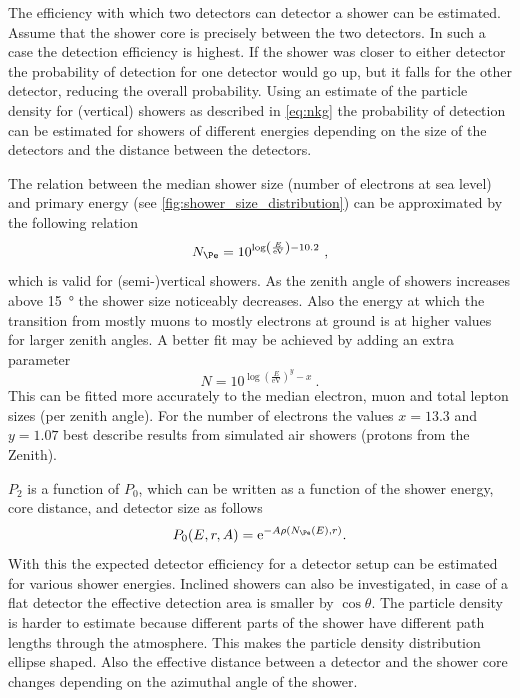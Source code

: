 The efficiency with which two detectors can detector a shower can be estimated. Assume that the shower core is precisely between the two detectors. In such a case the detection efficiency is highest. If the shower was closer to either detector the probability of detection for one detector would go up, but it falls for the other detector, reducing the overall probability. Using an estimate of the particle density for (vertical) showers as described in \cref{eq:nkg} the probability of detection can be estimated for showers of different energies depending on the size of the detectors and the distance between the detectors.

The relation between the median shower size (number of electrons at sea level) and primary energy (see \cref{fig:shower_size_distribution}) can be approximated by the following relation
%
\begin{equation}
    N_{\Pe} = 10^{\log\left(\frac{E}{\si{\eV}}\right) - 10.2} \ ,
\end{equation}
%
which is valid for (semi-)vertical showers. As the zenith angle of showers increases above \SI{15}{\degree} the shower size noticeably decreases. Also the energy at which the transition from mostly muons to mostly electrons at ground is at higher values for larger zenith angles. A better fit may be achieved by adding an extra parameter
%
\begin{equation}
    N = 10^{\log\left(\frac{E}{\si{\eV}}\right)^y - x} \ .
\end{equation}
%
This can be fitted more accurately to the median electron, muon and total lepton sizes (per zenith angle). For the number of electrons the values $x = 13.3$ and $y = 1.07$ best describe results from simulated air showers (protons from the Zenith).

$P_2$ is a function of $P_0$, which can be written as a function of the shower energy, core distance, and detector size as follows
%
\begin{equation}
    P_0(E, r, A) = \mathrm{e}^{-A\rho(N_{\Pe}(E), r)} \\ .
\end{equation}
%
With this the expected detector efficiency for a detector setup can be estimated for various shower energies. Inclined showers can also be investigated, in case of a flat detector the effective detection area is smaller by $\cos \theta$. The particle density is harder to estimate because different parts of the shower have different path lengths through the atmosphere. This makes the particle density distribution ellipse shaped. Also the effective distance between a detector and the shower core changes depending on the azimuthal angle of the shower.

